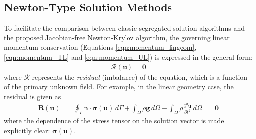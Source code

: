 \documentclass[sn-mathphys,Numbered]{sn-jnl}%
\newcommand{\bb}{\boldsymbol}
\begin{document}
\subsection{Newton-Type Solution Methods}
To facilitate the comparison between classic segregated solution algorithms and the proposed Jacobian-free Newton-Krylov algorithm, the governing linear momentum conservation (Equations \ref{eqn:momentum_lingeom}, \ref{eqn:momentum_TL} and \ref{eqn:momentum_UL}) is expressed in the general form:
\begin{eqnarray} \label{eqn:residual}
	\mathcal{R}(\bb{u}) = \bb{0}
\end{eqnarray}
where $\mathcal{R}$ represents the \emph{residual} (imbalance) of the equation, which is a function of the primary unknown field.
For example, in the linear geometry case, the residual is given as
\begin{eqnarray}
    \bb{R}(\bb{u})
    \;=\;
    \oint_{\Gamma} \bb{n} \cdot \bb{\sigma}(\bb{u}) \,  d\Gamma
    + \int_{\Omega}  \rho \bb{g} \, d\Omega
    -  \int_{\Omega} \rho \frac{\partial^2 \bb{u} }{\partial t^2} \, d\Omega
    \;=\; \bb{0}
\end{eqnarray}
where the dependence of the stress tensor on the solution vector is made explicitly clear: $\bb{\sigma}(\bb{u})$.
\end{document}
